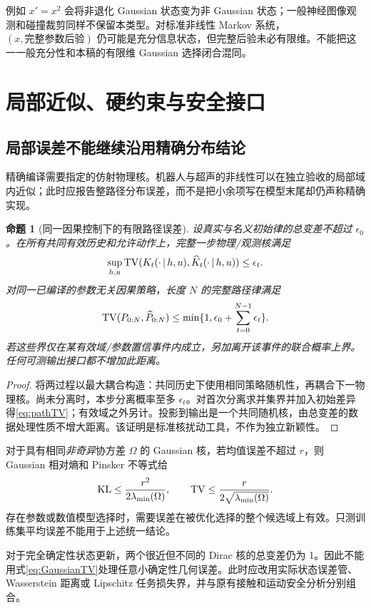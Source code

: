 \documentclass[UTF8,fontset=fandol,11pt,a4paper]{ctexart}
\DeclareMathOperator{\KL}{KL}\DeclareMathOperator{\Short}{Short}
\newtheorem{proposition}[theorem]{命题}\newtheorem{corollary}[theorem]{推论}
\theoremstyle{definition}\newtheorem{definition}[theorem]{定义}\newtheorem{assumption}[theorem]{条件}
\numberwithin{equation}{section}
\begin{document}
例如 $x'=x^2$ 会将非退化 Gaussian 状态变为非 Gaussian 状态；一般神经图像观测和碰撞裁剪同样不保留本类型。对标准非线性 Markov 系统，$(x,\text{完整参数后验})$ 仍可能是充分信息状态，但完整后验未必有限维。不能把这一一般充分性和本稿的有限维 Gaussian 选择闭合混同。

\section{局部近似、硬约束与安全接口}
\label{sec:robust}
\subsection{局部误差不能继续沿用精确分布结论}
精确编译需要指定的仿射物理核。机器人与超声的非线性可以在独立验收的局部域内近似；此时应报告整路径分布误差，而不是把小余项写在模型末尾却仍声称精确实现。

\begin{proposition}[同一因果控制下的有限路径误差]
\label{prop:kernelerror}
设真实与名义初始律的总变差不超过 $\epsilon_0$。在所有共同有效历史和允许动作上，完整一步物理/观测核满足
\[
\sup_{h,u}\operatorname{TV}(K_t(\cdot\,|\, h,u),\widehat K_t(\cdot\,|\, h,u))\le\epsilon_t.
\]
对同一已编译的参数无关因果策略，长度 $N$ 的完整路径律满足
\begin{equation}
\operatorname{TV}(P_{0:N},\widehat P_{0:N})
\le\min\{1,\epsilon_0+\sum_{t=0}^{N-1}\epsilon_t\}.
\label{eq:pathTV}
\end{equation}
若这些界仅在某有效域/参数置信事件内成立，另加离开该事件的联合概率上界。任何可测输出接口都不增加此距离。
\end{proposition}
\begin{proof}
将两过程以最大耦合构造：共同历史下使用相同策略随机性，再耦合下一物理核。尚未分离时，本步分离概率至多 $\epsilon_t$。对首次分离求并集界并加入初始差异得\eqref{eq:pathTV}；有效域之外另计。投影到输出是一个共同随机核，由总变差的数据处理性质不增大距离。该证明是标准核扰动工具，不作为独立新颖性。
\end{proof}

对于具有相同\emph{非奇异}协方差 $\Omega$ 的 Gaussian 核，若均值误差不超过 $r$，则 Gaussian 相对熵和 Pinsker 不等式给
\begin{equation}
\KL\le\frac{r^2}{2\lambda_{\min}(\Omega)},
\qquad \TV\le\frac{r}{2\sqrt{\lambda_{\min}(\Omega)}}.
\label{eq:GaussianTV}
\end{equation}
存在参数或数值模型选择时，需要误差在被优化选择的整个候选域上有效。只测训练集平均误差不能用于上述统一结论。

对于完全确定性状态更新，两个很近但不同的 Dirac 核的总变差仍为 1。因此不能用式\eqref{eq:GaussianTV}处理任意小确定性几何误差。此时应改用实际状态误差管、Wasserstein 距离或 Lipschitz 任务损失界，并与原有接触和运动安全分析分别组合。
\end{document}
